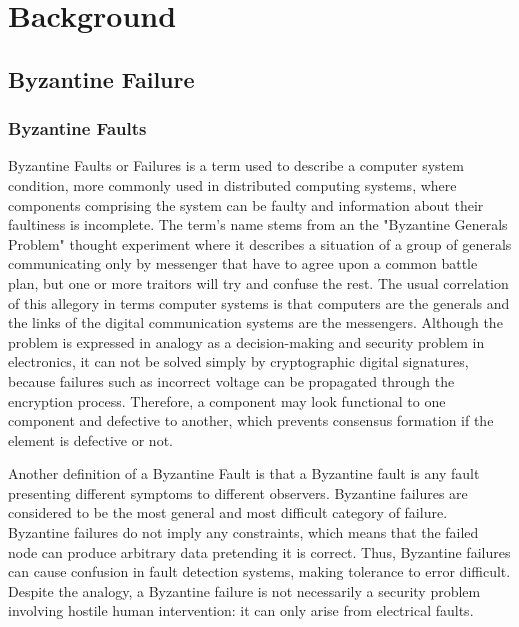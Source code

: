\documentclass[12pt,a4paper]{report}
\begin{document}
	\newpage

	\chapter{Background}
		\section{Byzantine Failure}
			\subsection{Byzantine Faults}
			Byzantine Faults or Failures is a term used to describe a computer system condition, more commonly used in distributed computing systems, where 
			components comprising the system can be faulty and information about their faultiness is incomplete\cite{bf}. The term's name stems from an
			the "Byzantine Generals Problem"\cite{generals} thought experiment where it describes a situation of a group of generals communicating only by 
			messenger that have to agree upon a common battle plan, but one or more traitors will try and confuse the rest. The usual correlation of this allegory in terms computer systems is that computers are the generals and the links of the digital communication systems are the messengers. Although the problem is expressed in analogy as a decision-making and security problem in electronics, it can not be solved simply by cryptographic digital signatures, because failures such as incorrect voltage can be propagated through the encryption process. Therefore, a component may look functional to one component and defective to another, which prevents consensus formation if the element is defective or not.
			

			 Another definition of a Byzantine
			Fault is that a Byzantine fault is any fault presenting different symptoms to different observers\cite{realgenerals}. Byzantine failures are
			considered to be the most general and most difficult category of failure. Byzantine failures do not imply any constraints, which means that the
			failed node can produce arbitrary data pretending it is correct. Thus,
			Byzantine failures can cause confusion in fault detection systems, making tolerance to error difficult. Despite the analogy, a Byzantine failure
			is not necessarily a security problem involving hostile human intervention: it can only arise from electrical faults.
\end{document}
